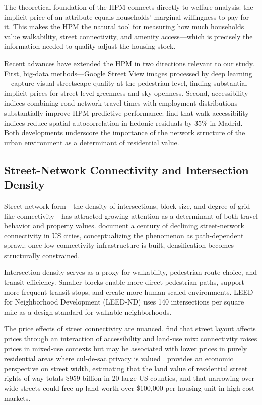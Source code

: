 \documentclass[12pt,a4paper]{article}
\begin{document}
The theoretical foundation of the HPM connects directly to welfare analysis:
the implicit price of an attribute equals households' marginal willingness to
pay for it.  This makes the HPM the natural tool for measuring how much
households value walkability, street connectivity, and amenity access—which is
precisely the information needed to quality-adjust the housing stock.

Recent advances have extended the HPM in two directions relevant to our study.
First, big-data methods—Google Street View images processed by deep learning
\citep{qiu2022}—capture visual streetscape quality at the pedestrian level,
finding substantial implicit prices for street-level greenness and sky openness.
Second, accessibility indices combining road-network travel times with
employment distributions substantially improve HPM predictive performance:
\citet{madrid2023} find that walk-accessibility indices reduce spatial
autocorrelation in hedonic residuals by 35\% in Madrid.  Both developments
underscore the importance of the network structure of the urban environment as
a determinant of residential value.

\subsection{Street-Network Connectivity and Intersection Density}
\label{sec:lit_network}

Street-network form—the density of intersections, block size, and degree of
grid-like connectivity—has attracted growing attention as a determinant of both
travel behavior and property values.  \citet{barrington2015,barrington2020}
document a century of declining street-network connectivity in US cities,
conceptualizing the phenomenon as path-dependent sprawl: once low-connectivity
infrastructure is built, densification becomes structurally constrained.

Intersection density serves as a proxy for walkability, pedestrian route choice,
and transit efficiency.  Smaller blocks enable more direct pedestrian paths,
support more frequent transit stops, and create more human-scaled environments.
LEED for Neighborhood Development (LEED-ND) uses 140 intersections per square
mile as a design standard for walkable neighborhoods.

The price effects of street connectivity are nuanced.  \citet{matthews2007} find
that street layout affects prices through an interaction of accessibility and
land-use mix: connectivity raises prices in mixed-use contexts but may be
associated with lower prices in purely residential areas where cul-de-sac
privacy is valued \citep{song2003}.  \citet{millardball2022} provides an
economic perspective on street width, estimating that the land value of
residential street rights-of-way totals \$959 billion in 20 large US counties,
and that narrowing over-wide streets could free up land worth over \$100,000
per housing unit in high-cost markets.
\end{document}
